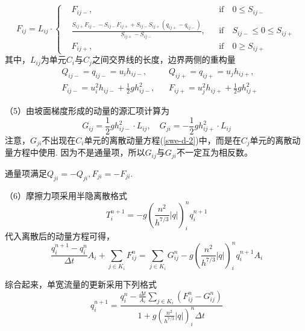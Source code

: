 \begin{equation}
F_{ij} = L_{ij} \cdot \left\{
\begin{aligned}
	& F_{ij-}, && \mbox{if} \quad 0\leq S_{ij-} \\
	& \frac{S_{ij+} F_{ij-} - S_{ij-} F_{ij+} + S_{ij-} S_{ij+} \left(q_{ij+} - q_{ij-}\right)}{S_{ij+}-S_{ij-}} , && \mbox{if} \quad S_{ij-} \leq 0\leq S_{ij+}\\
	& F_{ij+}, && \mbox{if} \quad 0\geq S_{ij+}
\end{aligned}\right.
\end{equation}
其中，$L_{ij}$为单元$C_i$与$C_j$之间交界线的长度，边界两侧的重构量
\begin{align*}
&Q_{ij-} = q_{ij-} = u_i h_{ij-},  && Q_{ij+} = q_{ij+} = u_j h_{ij+}, \\
&F_{ij-} = u_i^2h_{ij-}+\frac{1}{2}gh_{ij-}^2, && F_{ij+} = u_j^2h_{ij+}+\frac{1}{2}gh_{ij+}^2
\end{align*}

（5）由坡面梯度形成的动量的源汇项计算为\citep{audusse2004scientificcomputing}
\begin{equation}
G_{ij} = \frac{1}{2}gh_{ij-}^2 \cdot L_{ij}, \quad
G_{ji}=-\frac{1}{2}g h_{ij+}^2 \cdot L_{ij}
\end{equation}
注意，$G_{ji}$不出现在$C_i$单元的离散动量方程(\ref{swe-d-2})中，而是在$C_j$单元的离散动量方程中使用. 因为不是通量项，所以$G_{ij}$与$G_{ji}$不一定互为相反数。

通量项满足$Q_{ji} = -Q_{ji},F_{ji}=-F_{ji}$.

（6）摩擦力项采用半隐离散格式
\begin{equation}
T^{n+1}_i = -g \left(\frac{n^2}{h^{7/3}} \left|q\right|\right)^n_i q^{n+1}_i
\end{equation}
代入离散后的动量方程可得，
 \begin{equation}
 \frac{ q^{n+1}_i - q^n_i}{\Delta t} A_i + \sum_{j\in K_i} F^n_{ij} = \sum_{j\in K_i} G^n_{ij}  -g \left(\frac{n^2}{h^{7/3}} \left|q\right|\right)^n_i q^{n+1}_i  A_i 
  \end{equation}

综合起来，单宽流量的更新采用下列格式
\begin{equation}
q^{n+1}_i = \frac{q^n_i - \frac{\Delta t}{A_i}\sum_{j\in K_i} \left(F^n_{ij} - G^n_{ij}\right)}{1 + g \left(\frac{n^2}{h^{7/3}} \left|q\right|\right)^n_i \Delta t}
\end{equation}

